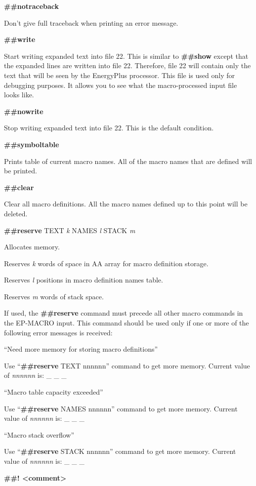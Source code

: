 \textbf{\#\#notraceback}

Don't give full traceback when printing an error message.

\textbf{\#\#write}

Start writing expanded text into file 22. This is similar to \textbf{\#\#show} except that the expanded lines are written into file 22. Therefore, file 22 will contain only the text that will be seen by the EnergyPlus processor. This file is used only for debugging purposes. It allows you to see what the macro-processed input file looks like.

\textbf{\#\#nowrite}

Stop writing expanded text into file 22. This is the default condition.

\textbf{\#\#symboltable}

Prints table of current macro names. All of the macro names that are defined will be printed.

\textbf{\#\#clear}

Clear all macro definitions. All the macro names defined up to this point will be deleted.

\textbf{\#\#reserve} TEXT \emph{k} NAMES \emph{l} STACK \emph{m}

Allocates memory.

Reserves \emph{k} words of space in AA array for macro definition storage.

Reserves \emph{l} positions in macro definition names table.

Reserves \emph{m} words of stack space.

If used, the \textbf{\#\#reserve} command must precede all other macro commands in the EP-MACRO input. This command should be used only if one or more of the following error messages is received:

``Need more memory for storing macro definitions''

Use ``\textbf{\#\#reserve} TEXT nnnnnn'' command to get more memory. Current value of \emph{nnnnnn} is: \_ \_ \_

``Macro table capacity exceeded''

Use ``\textbf{\#\#reserve} NAMES nnnnnn'' command to get more memory. Current value of \emph{nnnnnn} is: \_ \_ \_

``Macro stack overflow''

Use ``\textbf{\#\#reserve} STACK nnnnnn'' command to get more memory. Current value of \emph{nnnnnn} is: \_ \_ \_

\textbf{\#\#! \textless{}comment\textgreater{}}

